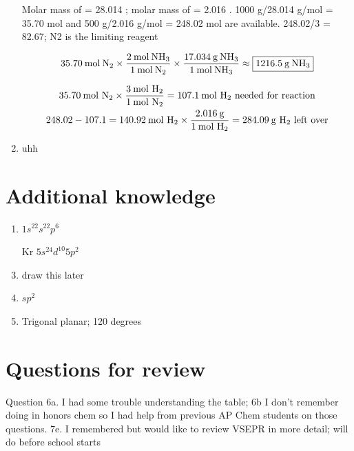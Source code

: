 \documentclass[a4paper, 12pt]{article}
\newcommand{\lab}[1]{\: \text{#1}}
\begin{document}
\begin{enumerate}[label=\alph*.]
Molar mass of  = 28.014 \lab{g/mol}; molar mass of  = 2.016 \lab{g/mol}. 1000 g/28.014 g/mol = 35.70 mol  and 500 g/2.016 g/mol = 248.02 mol  are available. 248.02/3 = 82.67; N2 is the limiting reagent

$$35.70 \lab{mol} \: \ce{N2} \times \frac{2 \lab{mol} \: \ce{NH3}}{1 \lab{mol} \: \ce{N2}} \times \frac{17.034 \lab{g} \: \ce{NH3}}{1 \lab{mol} \: \ce{NH3}} \approx \boxed{1216.5 \lab{g} \: \ce{NH3}}$$

\begin{gather*}
35.70 \lab{mol \ce{N2}} \times \frac{3 \lab{mol \ce{H2}}}{1 \lab{mol \ce{N2}}} = 107.1 \lab{mol \ce{H2} needed for reaction} \\
248.02-107.1 = 140.92 \lab{mol \ce{H2}} \times \frac{2.016 \lab{g}}{1 \lab{mol \ce{H2}}} = 284.09 \lab{g \ce{H2} left over}
\end{gather*}
\item uhh
\end{enumerate}

\section{Additional knowledge}

\begin{enumerate}[label=\alph*.]
\item $1s^22s^22p^6$
\item [Kr]$5s^24d^{10}5p^2$
\item draw this later
\item $sp^2$
\item Trigonal planar; 120 degrees
\end{enumerate}

\section{Questions for review}

Question 6a. I had some trouble understanding the table; 6b I don't remember doing in honors chem so I had help from previous AP Chem students on those questions. 7e. I remembered but would like to review VSEPR in more detail; will do before school starts
\end{document}

